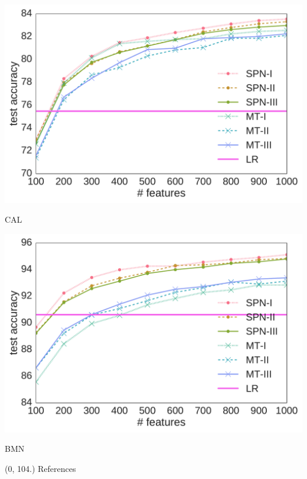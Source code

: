 \documentclass[final]{beamer}
\begin{document}
\begin{frame}{}
\begin{textblock}{80}
\begin{center}
\begin{minipage}[t]{0.2\linewidth}
\begin{center}
          \includegraphics[width=1.0\linewidth]{figures/lines-ocr_letters}\par
          \footnotesize\textsf{CAL}
        \end{center}
      \end{minipage}\begin{minipage}[t]{0.2\linewidth}
        \begin{center}
          \includegraphics[width=1.0\linewidth]{figures/lines-bmnist}\par
          \footnotesize\textsf{BMN}
        \end{center}
      \end{minipage}
    \end{center}
  \end{textblock}
  
  \begin{textblock}{80}(0, 104.)
    References
  \end{textblock}


\end{frame}
\end{document}
